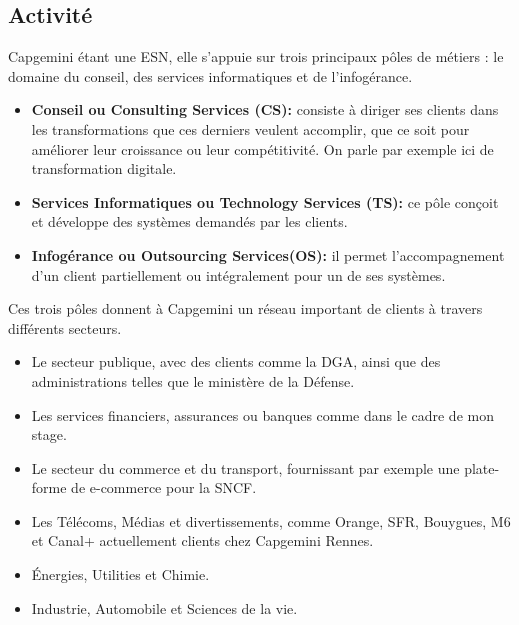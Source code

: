 \documentclass{rapport}
\begin{document}
\subsection{Activité}

Capgemini étant une ESN, elle s'appuie sur trois principaux pôles de métiers : le domaine du conseil, des services informatiques et de l'infogérance.
\begin{itemize}
  \item \textbf{Conseil ou Consulting Services (CS):} consiste à diriger ses clients dans les transformations que ces derniers veulent accomplir, que ce soit pour améliorer leur croissance ou leur compétitivité. On parle par exemple ici de transformation digitale.
  
  \item \textbf{Services Informatiques ou Technology Services (TS):} ce pôle conçoit et développe des systèmes demandés par les clients.
  
  \item \textbf{Infogérance ou Outsourcing Services(OS):} il permet l'accompagnement d'un client partiellement ou intégralement pour un de ses systèmes. 
\end{itemize}
\vspace{5mm}
Ces trois pôles donnent à Capgemini un réseau important de clients à travers différents secteurs.

\begin{itemize}
  \item Le secteur publique, avec des clients comme la DGA, ainsi que des administrations telles que le ministère de la Défense.
  
  \item Les services financiers, assurances ou banques comme dans le cadre de mon stage.
  
  \item Le secteur du commerce et du transport, fournissant par exemple une plate-forme de e-commerce pour la SNCF.
  
  \item Les Télécoms, Médias et divertissements, comme  Orange, SFR, Bouygues, M6 et Canal+ actuellement clients chez Capgemini Rennes.
  
  \item Énergies, Utilities et Chimie.
  
  \item Industrie, Automobile et Sciences de la vie.
\end{itemize}
\end{document}

